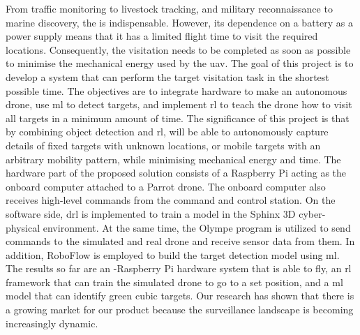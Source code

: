 \documentclass[../main.tex]{subfiles}
\begin{document}
From traffic monitoring to livestock tracking, and 
military reconnaissance to marine discovery, the \uav
is indispensable.
However, its dependence on a battery as a power supply means
that it has a limited flight time to visit the required
locations. 
Consequently, the visitation needs to be
completed as soon as possible to minimise 
the mechanical energy used by the \gls{uav}.
The goal of this project is to develop a system 
that can perform the target visitation task in the shortest
possible time. The objectives are to integrate hardware to make
an autonomous drone, use \gls{ml} 
to detect targets,
and implement \gls{rl} to 
teach the drone how to visit all targets in a minimum amount of time.
The significance of this project is that 
by combining object detection and \gls{rl}, \uavs will be
able to autonomously capture details of 
fixed targets with unknown locations, 
or mobile targets with an arbitrary mobility pattern,
while minimising mechanical energy and time.
The hardware part of the proposed solution 
consists of a Raspberry Pi acting as the onboard computer
attached to a Parrot \anafi drone. The onboard computer
also receives high-level commands from the command and control
station. On the software side, \gls{drl} is 
implemented to train a model in the Sphinx 3D
cyber-physical environment. At the same time,
the Olympe program is utilized
to send commands to the simulated and real \anafi drone
and receive sensor data from them. 
In addition, RoboFlow is employed
to build the target detection model using \gls{ml}.
The results so far are an \anafi-Raspberry Pi hardware system
that is able to fly, an \gls{rl} framework that can train the
simulated drone to go to a set position, and a \gls{ml}
model that can identify green cubic targets.
Our research has shown that there is a growing market for
our product because the surveillance landscape
is becoming increasingly dynamic.
\end{document}
